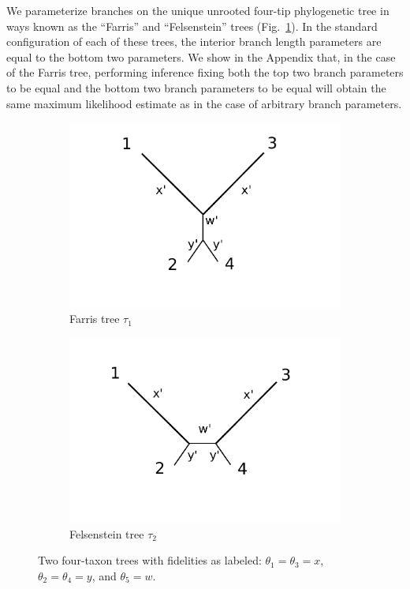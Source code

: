 \documentclass{article}
\begin{document}
We parameterize branches on the unique unrooted four-tip phylogenetic tree in ways known as the ``Farris'' and ``Felsenstein'' trees (Fig.~\ref{fig:farris-fels-top}).
In the standard configuration of each of these trees, the interior branch length parameters are equal to the bottom two parameters.
We show in the Appendix that, in the case of the Farris tree, performing inference fixing both the top two branch parameters to be equal and the bottom two branch parameters to be equal will obtain the same maximum likelihood estimate as in the case of arbitrary branch parameters.

\begin{figure}
\centering
\begin{subfigure}{.45\linewidth}
\centering
\includegraphics[width=\textwidth]{farris_blank}
\caption[short]{Farris tree $\tau_1$}
\end{subfigure}
\begin{subfigure}{.45\linewidth}
\centering
\includegraphics[width=\textwidth]{felsenstein_blank}
\caption[short]{Felsenstein tree $\tau_2$}
\end{subfigure}
\caption{Two four-taxon trees with fidelities as labeled: $\theta_1=\theta_3=x$, $\theta_2=\theta_4=y$, and $\theta_5=w$.
}
\label{fig:farris-fels-top}
\end{figure}
\end{document}
